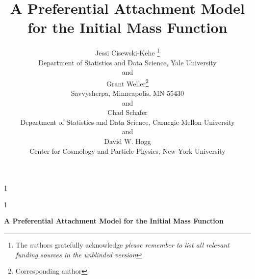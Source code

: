 \documentclass[12pt]{article}
\newcommand{\blind}{1}
\begin{document}
\def\spacingset#1{\renewcommand{\baselinestretch}%
{#1}\small\normalsize} \spacingset{1}





\blind
{
  \title{\bf A Preferential Attachment Model for the Initial Mass Function}
  \author{Jessi Cisewski-Kehe \thanks{
    The authors gratefully acknowledge \textit{please remember to list all relevant funding sources in the unblinded version}}\hspace{.2cm}\\
    Department of Statistics and Data Science, Yale University\\
    and \\
    Grant Weller\thanks{
    Corresponding author}\hspace{.2cm}\\
  Savvysherpa, Minneapolis, MN 55430 \\
    and \\
    Chad Schafer \\
    Department of Statistics and Data Science, Carnegie Mellon University \\
        and \\
    David W. Hogg \\
    Center for Cosmology and Particle Physics, New York University 
    }
  \maketitle
} \fi

\blind
{
  \bigskip
  \bigskip
  \bigskip
  \begin{center}
    {\LARGE\bf A Preferential Attachment Model for the Initial Mass Function}
\end{center}
  \medskip
} \fi
\end{document}
